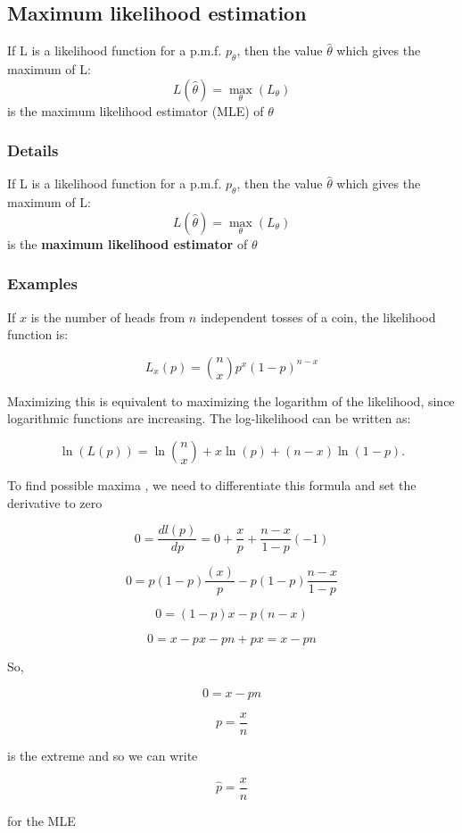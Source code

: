 \documentclass[12pt,a4paper]{article}
\theoremstyle{regla}
\theoremstyle{remark}
\theoremstyle{definition}
\theoremstyle{nonumberbreak}
\begin{document}
\subsection{Maximum likelihood estimation}
\begin{fbox}
\begin{minipage}{0.97\textwidth}
If L is a likelihood function for a p.m.f. $ p_{\theta}$, then the value $\hat{\theta}$ which gives the maximum of L:
$$ 
L (\hat{\theta}) = \max_\theta ({L}_\theta) 
$$
is the maximum likelihood estimator (MLE) of $\theta$

\end{minipage}
\end{fbox}
\subsubsection{Details}
\begin{defn}
If L is a likelihood function for a p.m.f. $ p_{\theta}$, then the value $\hat{\theta}$ which gives the maximum of L:
$$ 
L (\hat{\theta}) = \max_\theta ({L}_\theta) 
$$
is the {\bf maximum likelihood estimator} of $\theta$
\end{defn}

\subsubsection{Examples}
\begin{xmpl}
If $x$ is the number of heads from $n$ independent tosses of a coin, the likelihood function is:

$$ 
L_x(p) = {n \choose x} p^x (1-p)^{n-x} 
$$

Maximizing this is equivalent to maximizing the logarithm of the likelihood, since logarithmic functions are increasing. The log-likelihood can be written as:

$$
\ln (L(p))= \ln \binom{n}{x} + x \ln (p) + (n-x) \ln (1-p).
$$

To find possible maxima , we need to differentiate this formula and set the derivative to zero

$$ 0 = \frac{dl (p)}{dp} = 0 + \frac{x}{p}+\frac{n-x}{1-p}(-1)$$

$$ 0 = p(1-p) \frac{(x)}{p} - p(1-p)  \frac{n-x}{1-p}$$

$$ 0 = (1-p)x  - p(n-x)  $$

$$ 0 = x  - px -pn + px = x-pn  $$

So,

$$ 0 =  x-pn  $$

$$ p = \frac{x}{n} $$

is the extreme and so we can write

$$ \hat{p} = \frac{x}{n}$$

for the MLE
\end{xmpl}
\end{document}
